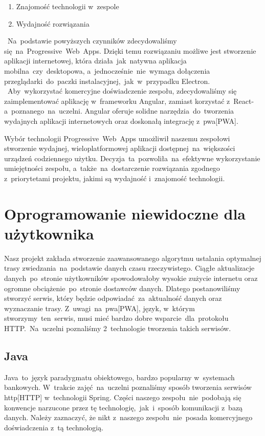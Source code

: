 \begin{enumerate}
    \item Znajomość technologii w~zespole
    \item Wydajność rozwiązania
\end{enumerate}
~Na~podstawie powyższych czynników zdecydowaliśmy się~na~Progressive~Web~Apps.
Dzięki temu rozwiązaniu możliwe jest stworzenie aplikacji internetowej, która działa~jak~natywna aplikacja mobilna~czy~desktopowa, a~jednocześnie~nie~wymaga dołączenia przeglądarki~do~paczki instalacyjnej,~jak~w~przypadku Electron.
~Aby~wykorzystać komercyjne doświadczenie zespołu, zdecydowaliśmy się zaimplementować aplikację w~frameworku Angular, zamiast korzystać z~React-a~poznanego~na~uczelni.
Angular oferuje solidne narzędzia~do~tworzenia wydajnych aplikacji internetowych oraz doskonałą integrację z~\acrshort{pwa}[PWA].

Wybór technologii Progressive~Web~Apps umożliwił naszemu zespołowi stworzenie wydajnej, wieloplatformowej aplikacji dostępnej~na~większości urządzeń codziennego użytku.
Decyzja~ta~pozwoliła~na~efektywne wykorzystanie umiejętności zespołu, a~także~na~dostarczenie rozwiązania zgodnego z~priorytetami projektu, jakimi są wydajność i~znajomość technologii.

\section{Oprogramowanie niewidoczne dla użytkownika}
\label{sec:oprogramowanie-niewidoczne-dla-uzytkownika}
Nasz projekt zakłada stworzenie zaawansowanego algorytmu ustalania optymalnej trasy zwiedzania~na~podstawie danych czasu rzeczywistego.
Ciągłe aktualizacje danych~po~stronie użytkowników spowodowałoby wysokie zużycie internetu oraz ogromne obciążenie~po~stronie dostawców danych.
Dlatego postanowiliśmy stworzyć serwis, który będzie odpowiadać~za~aktualność danych oraz wyznaczanie trasy.
Z~uwagi~na~\acrshort{pwa}[PWA], język, w~którym stworzymy~ten~serwis, musi mieć bardzo dobre wsparcie~dla~protokołu HTTP\@.~Na~uczelni poznaliśmy 2~technologie tworzenia takich serwisów.

\subsection{Java}\label{subsec:java}
Java~to~język paradygmatu obiektowego, bardzo popularny w~systemach bankowych.
W~trakcie zajęć~na~uczelni poznaliśmy sposób tworzenia serwisów \acrshort{http}[HTTP] w~technologii Spring.
Części naszego zespołu~nie~podobają się konwencje narzucone przez tę technologię,~jak~i~sposób komunikacji z~bazą danych.
Należy zaznaczyć, że nikt z~naszego zespołu~nie~posada komercyjnego doświadczenia z~tą technologią.

